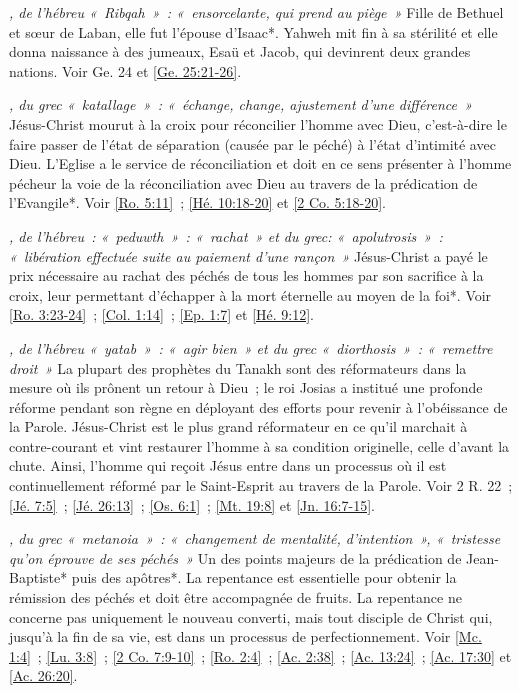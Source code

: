 \begin{multicols}{2}
\textit{, de l'hébreu «~Ribqah~»~: «~ensorcelante, qui prend au piège~»}\newline
Fille de Bethuel et sœur de Laban, elle fut l'épouse d'Isaac*. Yahweh mit fin à sa stérilité et elle donna naissance à des jumeaux, Esaü et Jacob, qui devinrent deux grandes nations. Voir Ge. 24 et \vref{Ge. 25:21-26}.

\textit{, du grec «~katallage~»~: «~échange, change, ajustement d'une différence~»}\newline
Jésus-Christ mourut à la croix pour réconcilier l'homme avec Dieu, c'est-à-dire le faire passer de l'état de séparation (causée par le péché) à l'état d'intimité avec Dieu. L'Eglise a le service de réconciliation et doit en ce sens présenter à l'homme pécheur la voie de la réconciliation avec Dieu au travers de la prédication de l'Evangile*. Voir \vref{Ro. 5:11}~; \vref{Hé. 10:18-20} et \vref{2 Co. 5:18-20}.

\textit{, de l'hébreu~: «~peduwth~»~: «~rachat~» et du grec: «~apolutrosis~»~: «~libération effectuée suite au paiement d'une rançon~»}\newline
Jésus-Christ a payé le prix nécessaire au rachat des péchés de tous les hommes par son sacrifice à la croix, leur permettant d'échapper à la mort éternelle au moyen de la foi*. Voir \vref{Ro. 3:23-24}~; \vref{Col. 1:14}~; \vref{Ep. 1:7} et \vref{Hé. 9:12}.

\textit{, de l'hébreu «~yatab~»~: «~agir bien~» et du grec «~diorthosis~»~: «~remettre droit~»}\newline
La plupart des prophètes du Tanakh sont des réformateurs dans la mesure où ils prônent un retour à Dieu~; le roi Josias a institué une profonde réforme pendant son règne en déployant des efforts pour revenir à l'obéissance de la Parole. Jésus-Christ est le plus grand réformateur en ce qu'il marchait à contre-courant et vint restaurer l'homme à sa condition originelle, celle d'avant la chute. Ainsi, l'homme qui reçoit Jésus entre dans un processus où il est continuellement réformé par le Saint-Esprit au travers de la Parole.\newline
Voir 2 R. 22~; \vref{Jé. 7:5}~; \vref{Jé. 26:13}~; \vref{Os. 6:1}~; \vref{Mt. 19:8} et \vref{Jn. 16:7-15}.

\textit{, du grec «~metanoia~»~: «~changement de mentalité, d'intention~», «~tristesse qu'on éprouve de ses péchés~»}\newline
Un des points majeurs de la prédication de Jean-Baptiste* puis des apôtres*. La repentance est essentielle pour obtenir la rémission des péchés et doit être accompagnée de fruits. La repentance ne concerne pas uniquement le nouveau converti, mais tout disciple de Christ qui, jusqu'à la fin de sa vie, est dans un processus de perfectionnement. Voir \vref{Mc. 1:4}~; \vref{Lu. 3:8}~; \vref{2 Co. 7:9-10}~; \vref{Ro. 2:4}~; \vref{Ac. 2:38}~; \vref{Ac. 13:24}~; \vref{Ac. 17:30} et \vref{Ac. 26:20}.


\end{multicols}
